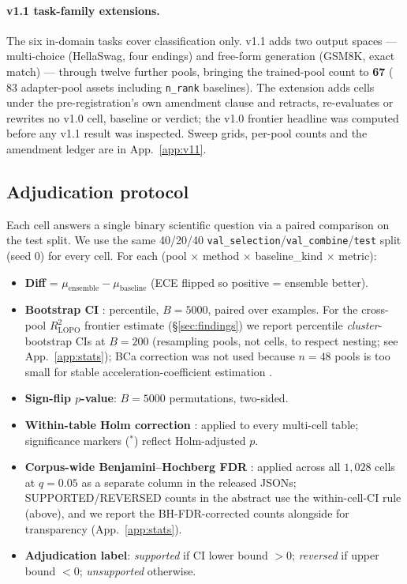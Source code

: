 \documentclass[11pt]{article}
\begin{document}
\paragraph{v1.1 task-family extensions.} The six in-domain tasks cover classification only. v1.1 adds two output spaces --- multi-choice (HellaSwag, four endings) and free-form generation (GSM8K, exact match) --- through twelve further pools, bringing the trained-pool count to \textbf{67} ($83$ adapter-pool assets including \texttt{n\_rank} baselines). The extension adds cells under the pre-registration's own amendment clause and retracts, re-evaluates or rewrites no v1.0 cell, baseline or verdict; the v1.0 frontier headline was computed before any v1.1 result was inspected. Sweep grids, per-pool counts and the amendment ledger are in App.~\ref{app:v11}.

\subsection{Adjudication protocol}

Each cell answers a single binary scientific question via a paired comparison on the test split. We use the same 40/20/40 \texttt{val\_selection}/\texttt{val\_combine}/\texttt{test} split (seed 0) for every cell. For each (pool $\times$ method $\times$ baseline\_kind $\times$ metric):
\begin{itemize}[leftmargin=*]
\item \textbf{Diff} = $\mu_{\text{ensemble}} - \mu_{\text{baseline}}$ (ECE flipped so positive = ensemble better).
\item \textbf{Bootstrap CI} \citep{efron1979bootstrap}: percentile, $B{=}5000$, paired over examples. For the cross-pool $R^2_{\text{LOPO}}$ frontier estimate (\S\ref{sec:findings}) we report percentile \emph{cluster}-bootstrap CIs at $B{=}200$ (resampling pools, not cells, to respect nesting; see App.~\ref{app:stats}); BCa correction was not used because $n{=}48$ pools is too small for stable acceleration-coefficient estimation \citep{diciccio1996}.
\item \textbf{Sign-flip $p$-value}: $B{=}5000$ permutations, two-sided.
\item \textbf{Within-table Holm correction} \citep{holm1979simple}: applied to every multi-cell table; significance markers ($^{*}$) reflect Holm-adjusted $p$.
\item \textbf{Corpus-wide Benjamini--Hochberg FDR} \citep{bh1995}: applied across all $1{,}028$ cells at $q{=}0.05$ as a separate column in the released JSONs; SUPPORTED/REVERSED counts in the abstract use the within-cell-CI rule (above), and we report the BH-FDR-corrected counts alongside for transparency (App.~\ref{app:stats}).
\item \textbf{Adjudication label}: \emph{supported} if CI lower bound $> 0$; \emph{reversed} if upper bound $< 0$; \emph{unsupported} otherwise.
\end{itemize}
\end{document}

